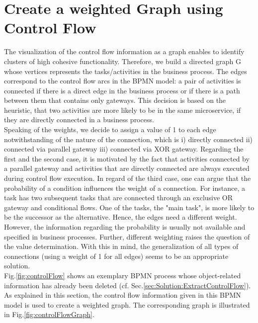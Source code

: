 \section{Create a weighted Graph using Control Flow}
\label{sec:Solution:CreateGraphControl}
The visualization of the control flow information as a graph enables to identify clusters of high cohesive functionality. Therefore, we build a directed graph G whose vertices represents the tasks/activities in the business process. The edges correspond to the control flow arcs in the BPMN model: a pair of activities is connected if there is a direct edge in the business process or if there is a path between them that contains only gateways. This decision is based on the heuristic, that two activities are more likely to be in the same microservice, if they are directly connected in a business process. \\
Speaking of the weights, we decide to assign a value of 1 to each edge notwithstanding of the nature of the connection, which is i) directly connected ii) connected via parallel gateway iii) connected via XOR gateway. Regarding the first and the second case, it is motivated by the fact that activities connected by a parallel gateway and activities that are directly connected are always executed during control flow execution.
In regard of the third case, one can argue that the probability of a condition influences the weight of a connection. For instance, a task has two subsequent tasks that are connected through an exclusive OR gateway and conditional flows. One of the tasks, the "main task", is more likely to be the successor as the alternative. Hence, the edges need a different weight. However, the information regarding the probability is usually not available and specified in business processes. Further, different weighting raises the question of the value determination. With this in mind, the generalization of all types of connections (using a weight of 1 for all edges) seems to be an appropriate solution. \\
Fig.\ref{fig:controlFlow} shows an exemplary BPMN process whose object-related information has already been deleted (cf. Sec.\ref{sec:Solution:ExtractControlFlow}). As explained in this section, the control flow information given in this BPMN model is used to create a weighted graph. The corresponding graph is illustrated in Fig.\ref{fig:controlFlowGraph}. 


